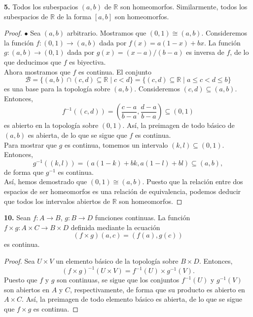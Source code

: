 \documentclass{article}
\begin{document}
\newpage

\begin{mybox}
	\textbf{5. } Todos los subespacios $(a, b)$  de $\mathbb{R}$ son homeomorfos. Similarmente, todos los subespacios de $\mathbb{R}$ de la forma $[a, b]$ son homeomorfos.
\end{mybox}	
\begin{proof}
	$\bullet$ Sea $(a, b)$ arbitrario. Mostramos que $(0,1) \cong (a, b)$. Consideremos la función $f: (0, 1) \rightarrow (a, b)$ dada por $f(x) = a(1-x) + bx$. La función $g: (a, b) \rightarrow (0, 1)$ dada por $g(x) = (x- a)/ (b - a)$ es inversa de $f$, de lo que deducimos que $f$ es biyectiva. \\
	 Ahora mostramos que $f$ es continua. El conjunto 
	$$ \mathcal{B} = \{ (a, b) \cap (c, d) \subseteq \mathbb{R} \mid c < d \} = \{ (c, d) \subseteq \mathbb{R} \mid a \leq c < d \leq b \}$$
	es una base para la topología sobre $(a, b)$.  Consideremos $(c, d) \subseteq (a, b)$. Entonces, 
	$$ f^{-1}((c, d)) = \left( \frac{c - a}{b - a}, \frac{d -a}{b - a} \right) \subseteq (0, 1) $$
	es abierto en la topología sobre $(0, 1)$. Así, la preimagen de todo básico de $(a, b)$ es abierta, de lo que se sigue que $f$ es continua. \\
	Para mostrar que $g$ es continua, tomemos un intervalo $(k, l) \subseteq (0,1)$. Entonces,
	$$ g^{-1}((k, l )) = ( a(1- k) + bk, a(1- l) + bl ) \subseteq (a, b), $$
	de forma que $g^{-1}$ es continua. \\
	Así, hemos demostrado que $(0, 1) \cong (a, b)$. Puesto que la relación entre dos espacios de ser homeomorfos es una relación de equivalencia, podemos deducir que todos los intervalos abiertos de $\mathbb{R}$ son homeomorfos. 
\end{proof}

\begin{mybox}
	\textbf{10. } Sean $f: A \rightarrow B$, $g: B \rightarrow D$ funciones continuas. La función $f \times g : A \times C \rightarrow B \times D$ definida mediante la ecuación
	$$ (f \times g)(a, c) = (f(a), g(c)) $$
	es continua. 
\end{mybox}	
\begin{proof}
	Sea $U \times V$ un elemento básico de la topología sobre $B \times D$. Entonces, 
	$$ (f \times g)^{-1}(U \times V) = f^{-1}(U) \times g^{-1}(V) .$$
	Puesto que $f$ y $g$ son continuas, se sigue que los conjuntos  $f^{-1}(U)$ y $ g^{-1}(V)$ son abiertos en $A$ y $C$, respectivamente, de forma que su producto es abierto en $A \times C$.  Así, la preimagen de todo elemento básico es abierta, de lo que se sigue que $f \times g$ es continua. 
\end{proof}
\end{document}
